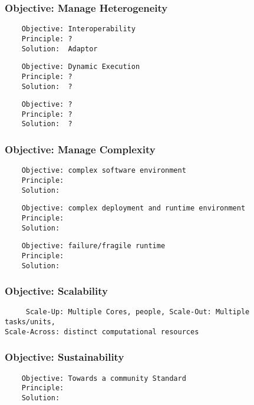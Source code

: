 \documentclass[a4paper,10pt]{article}
\begin{document}
 \subsubsection{Objective: Manage Heterogeneity}
  \begin{verbatim}
    Objective: Interoperability
    Principle: ?
    Solution:  Adaptor
   \end{verbatim}

  \begin{verbatim}
    Objective: Dynamic Execution
    Principle: ?
    Solution:  ?
   \end{verbatim}

  \begin{verbatim}
    Objective: ?
    Principle: ?
    Solution:  ?
   \end{verbatim}

 \subsubsection{Objective: Manage Complexity}
 
  \begin{verbatim}
    Objective: complex software environment 
    Principle: 
    Solution:  
   \end{verbatim} 

   \begin{verbatim}
    Objective: complex deployment and runtime environment
    Principle: 
    Solution:  
   \end{verbatim}

   \begin{verbatim}
    Objective: failure/fragile runtime 
    Principle: 
    Solution:  
   \end{verbatim}

 \subsubsection{Objective: Scalability}

   \begin{verbatim}
     Scale-Up: Multiple Cores, people, Scale-Out: Multiple tasks/units,
Scale-Across: distinct computational resources
   \end{verbatim}


\subsubsection{Objective: Sustainability}
  \begin{verbatim}
    Objective: Towards a community Standard 
    Principle: 
    Solution:  
   \end{verbatim}
\end{document}

